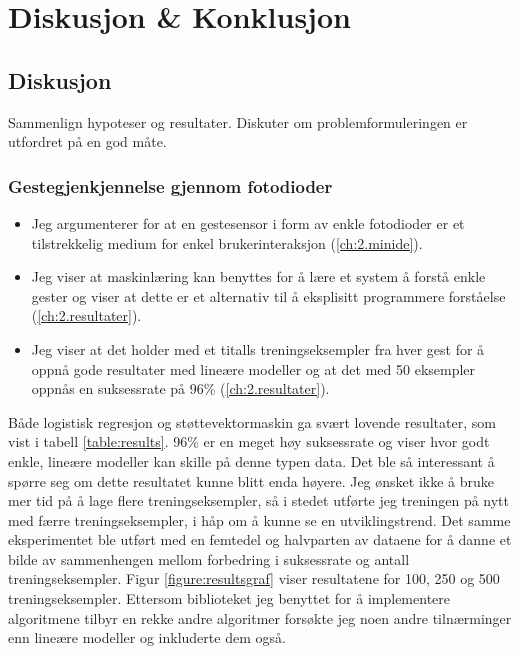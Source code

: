 \section[Diskusjon \& Konklusjon]{Diskusjon \& Konklusjon}
\subsection{Diskusjon}
{\color{red}Sammenlign hypoteser og resultater. Diskuter om problemformuleringen er utfordret på en god måte.}

\subsubsection*{Gestegjenkjennelse gjennom fotodioder}

\begin{itemize}
\item Jeg argumenterer for at en gestesensor i form av enkle fotodioder er et tilstrekkelig medium for enkel brukerinteraksjon (\ref{ch:2.minide}).
\item Jeg viser at maskinlæring kan benyttes for å lære et system å forstå enkle gester og viser at dette er et alternativ til å eksplisitt programmere forståelse (\ref{ch:2.resultater}).
\item Jeg viser at det holder med et titalls treningseksempler fra hver gest for å oppnå gode resultater med lineære modeller og at det med 50 eksempler oppnås en suksessrate på 96\% (\ref{ch:2.resultater}).
\end{itemize}

Både logistisk regresjon og støttevektormaskin ga svært lovende resultater, som vist i tabell \ref{table:results}. 96\% er en meget høy suksessrate og viser hvor godt enkle, lineære modeller kan skille på denne typen data. Det ble så interessant å spørre seg om dette resultatet kunne blitt enda høyere. Jeg ønsket ikke å bruke mer tid på å lage flere treningseksempler, så i stedet utførte jeg treningen på nytt med færre treningseksempler, i håp om å kunne se en utviklingstrend. Det samme eksperimentet ble utført med en femtedel og halvparten av dataene for å danne et bilde av sammenhengen mellom forbedring i suksessrate og antall treningseksempler. Figur \ref{figure:resultsgraf} viser resultatene for 100, 250 og 500 treningseksempler. Ettersom biblioteket jeg benyttet for å implementere algoritmene tilbyr en rekke andre algoritmer forsøkte jeg noen andre tilnærminger enn lineære modeller og inkluderte dem også.

